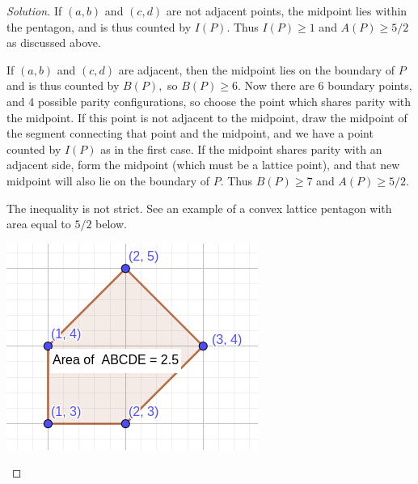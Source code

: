 \documentclass[12pt]{article}
\newenvironment{exercise}[2][Exercise]{\begin{trivlist}
        \item[\hskip \labelsep {\bfseries #1}\hskip \labelsep {\bfseries #2.}]}{\end{trivlist}}
\newenvironment{solution}
        {\begin{proof}[Solution]}
                    {\end{proof}}
\begin{document}
\begin{exercise}{75}
\begin{solution}
        If \( (a,b) \) and \( (c,d) \) are not adjacent points, the midpoint lies within the pentagon, and is thus counted by \( I(P) . \) Thus \( I(P) \geq 1 \) and \( A(P) \geq 5/2 \) as discussed above.

        If \( (a,b) \) and \( (c,d) \) are adjacent, then the midpoint lies on the boundary of \( P \) and is thus counted by \( B(P) , \) so \( B(P) \geq 6. \) Now there are 6 boundary points, and 4 possible parity configurations, so choose the point which shares parity with the midpoint. If this point is not adjacent to the midpoint, draw the midpoint of the segment connecting that point and the midpoint, and we have a point counted by \( I(P) \) as in the first case. If the midpoint shares parity with an adjacent side, form the midpoint (which must be a lattice point), and that new midpoint will also lie on the boundary of \( P . \) Thus \( B(P) \geq 7 \) and \( A(P) \geq 5/2. \)

        The inequality is not strict. See an example of a convex lattice pentagon with area equal to \( 5/2 \) below.
        \begin{center}
            \includegraphics[scale=.5]{75}
        \end{center}
    \end{solution}
\end{exercise}
\end{document}
